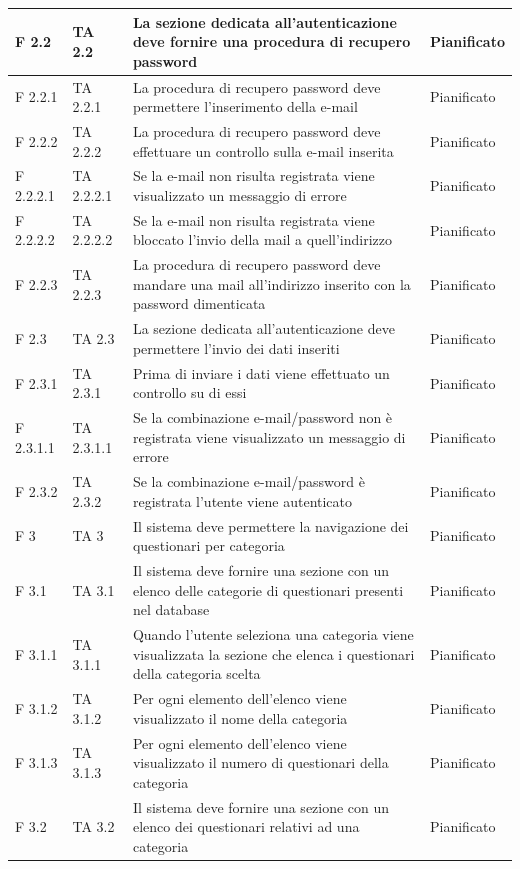 \documentclass[a4paper,11pt]{article}
\begin{document}
\begin{longtable}{p{}p{}p{}p{}}
\midrule
F 2.2 &TA 2.2&La sezione dedicata all'autenticazione deve fornire una procedura di recupero password & Pianificato\\
\midrule
F 2.2.1 &TA 2.2.1&La procedura di recupero password deve permettere l'inserimento della e-mail & Pianificato\\
\midrule
F 2.2.2 &TA 2.2.2&La procedura di recupero password deve effettuare un controllo sulla e-mail inserita & Pianificato\\
\midrule
F 2.2.2.1 &TA 2.2.2.1&Se la e-mail non risulta registrata viene visualizzato un messaggio di errore & Pianificato\\
\midrule
F 2.2.2.2 & TA 2.2.2.2&Se la e-mail non risulta registrata viene bloccato l'invio della mail a quell'indirizzo & Pianificato\\
\midrule
F 2.2.3 & TA 2.2.3&La procedura di recupero password deve mandare una mail all'indirizzo inserito con la password dimenticata & Pianificato\\
\midrule
F 2.3 & TA 2.3&La sezione dedicata all'autenticazione deve permettere l'invio dei dati inseriti & Pianificato\\
\midrule
F 2.3.1 & TA 2.3.1&Prima di inviare i dati viene effettuato un controllo su di essi & Pianificato\\
\midrule
F 2.3.1.1 & TA 2.3.1.1 &Se la combinazione e-mail/password non è registrata viene visualizzato un messaggio di errore & Pianificato\\
\midrule
F 2.3.2 & TA 2.3.2 &Se la combinazione e-mail/password è registrata l'utente viene autenticato & Pianificato\\
\midrule
F 3 & TA 3 &Il sistema deve permettere la navigazione dei questionari per categoria & Pianificato\\
\midrule
F 3.1 & TA 3.1 &Il sistema deve fornire una sezione con un elenco delle categorie di questionari presenti nel database & Pianificato\\
\midrule
F 3.1.1 & TA 3.1.1 &Quando l'utente seleziona una categoria viene visualizzata la sezione che elenca i questionari della categoria scelta & Pianificato\\
\midrule
F 3.1.2 & TA 3.1.2 &Per ogni elemento dell'elenco viene visualizzato il nome della categoria & Pianificato\\
\midrule
F 3.1.3 & TA 3.1.3 &Per ogni elemento dell'elenco viene visualizzato il numero di questionari della categoria & Pianificato\\
\midrule
F 3.2 & TA 3.2 &Il sistema deve fornire una sezione con un elenco dei questionari relativi ad una categoria & Pianificato\\

\end{longtable}
\end{document}
